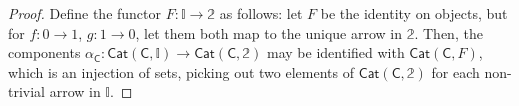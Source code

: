 \documentclass[10pt, oneside]{article}   	%
\newcommand{\cat}[1]{\mathsf{#1}}
\newcommand{\cc}{\cat{C}}
\newcommand{\ccat}{\cat{Cat}}
\newcommand{\two}{\mathbb{2}}
\begin{document}
\begin{proof}

Define the functor $F : \mathbb{I} \to \two$ as follows: let $F$ be the identity on objects, but for $f : 0 \to 1$, $g : 1 \to 0$, let them both map to the unique arrow in $\two$. Then, the components $\alpha_\cc : \ccat(\cc, \mathbb{I}) \to \ccat(\cc, \two)$ may be identified with $\ccat(\cc, F)$, which is an injection of sets, picking out two elements of $\ccat(\cc, \two)$ for each non-trivial arrow in $\mathbb{I}$. 

\end{proof}
\end{document}
